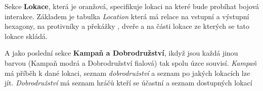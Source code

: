 Sekce \textbf{Lokace}, která je oranžová, specifikuje lokaci na které bude probíhat bojová interakce. Základem je tabulka \textit{Location} která má relace na vstupní a výstupní hexagony, na protivníky a překážky , dveře a na části lokace ze kterých se tato lokace skládá. 

A jako poslední sekce \textbf{Kampaň a Dobrodružství}, ikdyž jsou každá jinou barvou (Kampaň modrá a Dobrodružství fialová) tak spolu úzce souvisí. \textit{Kampaň} má příběh k dané lokaci, seznam \textit{dobrodružství} a seznam po jakých lokacích lze jít. \textit{Dobrodružství} má seznam hráčů kteří se účastní a  seznam dostupných lokací




